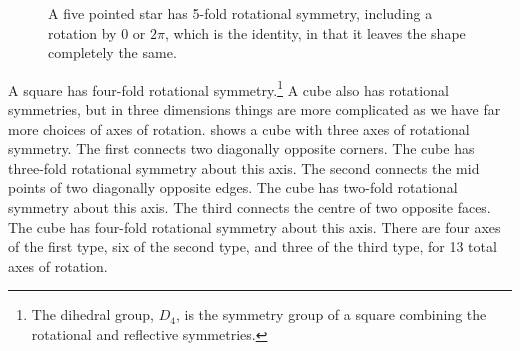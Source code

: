 \documentclass[fleqn]{NotesClass}
\begin{document}
    \begin{figure}
        \caption[Five fold rotational.]{A five pointed star has 5-fold rotational symmetry, including a rotation by \(0\) or \(2\pi\), which is the identity, in that it leaves the shape completely the same.}
        \label{fig:rotational symmetry star}
    \end{figure}

    A square has four-fold rotational symmetry.\footnote{The dihedral group, \(D_4\), is the symmetry group of a square combining the rotational and reflective symmetries.}
    A cube also has rotational symmetries, but in three dimensions things are more complicated as we have far more choices of axes of rotation.
     shows a cube with three axes of rotational symmetry.
    The first connects two diagonally opposite corners.
    The cube has three-fold rotational symmetry about this axis.
    The second connects the mid points of two diagonally opposite edges.
    The cube has two-fold rotational symmetry about this axis.
    The third connects the centre of two opposite faces.
    The cube has four-fold rotational symmetry about this axis.
    There are four axes of the first type, six of the second type, and three of the third type, for 13 total axes of rotation.
    
\end{document}
